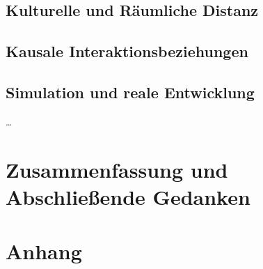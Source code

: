 \documentclass[openany,twoside,twocolumn]{book}
\let\pby\printbibliography
\renewcommand{\printbibliography}{}
\begin{document}
\hypertarget{kulturelle-und-raumliche-distanz}{%
\section{Kulturelle und Räumliche
Distanz}\label{kulturelle-und-raumliche-distanz}}

\hypertarget{kausale-interaktionsbeziehungen}{%
\section{Kausale
Interaktionsbeziehungen}\label{kausale-interaktionsbeziehungen}}

\hypertarget{simulation-und-reale-entwicklung}{%
\section{Simulation und reale
Entwicklung}\label{simulation-und-reale-entwicklung}}

\ldots{}

\pby[title={Literatur},segment=\therefsegment,heading=subbibintoc]

\hypertarget{zusammenfassung-und-abschlieende-gedanken}{%
\chapter{Zusammenfassung und Abschließende
Gedanken}\label{zusammenfassung-und-abschlieende-gedanken}}

\hypertarget{anhang}{%
\chapter{Anhang}\label{anhang}}

\printbibliography
\end{document}
